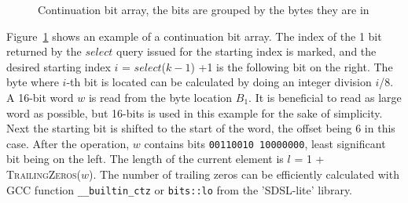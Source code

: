 \begin{figure}[ht]
\centering
{}
\caption{Continuation bit array, the bits are grouped by the bytes they are in} \label{subarray}
\end{figure}

Figure~\ref{subarray} shows an example of a continuation bit array. The index of the 1 bit returned by the $select$ query issued for the starting index is marked, and the desired starting index 
$i$ = $select$($k-1$) +1 is the following bit on the right. The byte where $i$-th bit is located can be calculated by doing an integer division $i$/8. A 16-bit word $w$ is read from the byte location $B_1$.
It is beneficial to read as large word as possible, but 16-bits is used in this example for the sake of simplicity. Next the starting bit is shifted to the start of the word, the offset being 6 in this case. 
After the operation, $w$ contains bits \texttt{00110010 10000000}, least significant bit being on the left. The length of the current element is $l$ = 1 + \textsc{TrailingZeros}($w$). The number of 
trailing zeros can be efficiently calculated with GCC function \texttt{\_\_builtin\_ctz} or \texttt{bits::lo} from the 'SDSL-lite' library.


